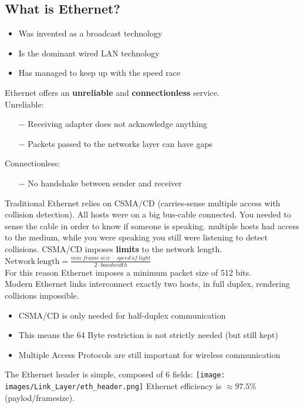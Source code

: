 \documentclass[a4paper, fontsize=8pt, landscape, DIV=1]{scrartcl}
\begin{document}
\begin{multicols*}{4}
		\subsection{What is Ethernet?}
		\begin{itemize}[noitemsep]
			\item Was invented as a broadcast technology
			\item Is the dominant wired LAN technology 
			\item Has managed to keep up with the speed race
		\end{itemize}
		Ethernet offers an \textbf{unreliable} and \textbf{connectionless}
		service.\\
		Unreliable:
		\begin{itemize}[noitemsep]
			\item[$-$] Receiving adapter does not acknowledge anything
			\item[$-$] Packets passed to the networks layer can have gaps
		\end{itemize}
		Connectionless: 
		\begin{itemize}[noitemsep]
			\item[$-$] No handshake between sender and receiver
		\end{itemize}
		Traditional Ethernet relies on CSMA/CD (carries-sense multiple access with
		collision detection). All hosts were on a big bus-cable connected. You needed to
		sense the cable in order to know if someone is speaking. multiple hosts had
		access to the medium, while you were speaking you still were listening to detect
		collisions. CSMA/CD imposes \textbf{limits} to the network length.\\
		$\mathrm{Network\ length}=\frac{min\ frame\ size\ \cdot\ speed\ of\
			light}{2\cdot bandwidth}$\\
		For this reason Ethernet imposes a minimum packet size of 512 bits.\\
		Modern Ethernet links interconnect exactly two hosts, in full duplex,
		rendering collisions impossible. 
		\begin{itemize}[noitemsep]
			\item CSMA/CD is only needed for half-duplex communication
			\item This means the 64 Byte restriction is not strictly needed (but
			still kept)
			\item Multiple Access Protocols are still important for wireless
			communication
		\end{itemize}
		The Ethernet header is simple, composed of 6 fields: 
		\texttt{[image: images/Link\_Layer/eth\_header.png]}
		Ethernet efficiency is $\approx97.5\%$ (paylod/framesize). 
		

\end{multicols*}
\end{document}
